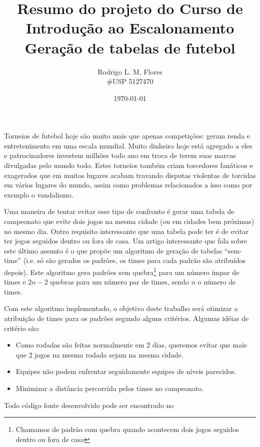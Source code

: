 \documentclass[a4paper,12pt,notitlepage]{article}
\title{Resumo do projeto do Curso de Introdução ao Escalonamento \\ Geração de tabelas de futebol}
\author{Rodrigo L. M. Flores \\ \#USP 5127470}
\date{\today}
\begin{document}
\maketitle

Torneios de futebol hoje são muito mais que apenas competições: geram renda e entretenimento em uma escala mundial. Muito dinheiro
hoje está agregado a eles e patrocinadores investem milhões todo ano em troca de terem suas marcas divulgadas pelo mundo todo. Estes
torneios também criam torcedores fanáticos e exagerados que em muitos lugares acabam travando disputas violentas de torcidas em vários 
lugares do mundo, assim como problemas relacionados a isso como por exemplo o vandalismo.

Uma maneira de tentar evitar esse tipo de confronto é gerar uma tabela de campeonato que evite
dois jogos na mesma cidade (ou em cidades bem próximas) no mesmo dia. Outro requisito interessante que uma tabela pode ter é de evitar
ter jogos seguidos dentro ou fora de casa. Um artigo interessante que fala sobre este último assunto é o %
que propõe um algoritmo de geração de tabelas ``sem-time'' (i.e. só são gerados os padrões, os times para cada padrão 
são atribuídos depois). Este algoritmo gera padrões sem quebra\footnote{Chamamos de padrão com quebra quando acontecem dois jogos seguidos
dentro ou fora de casa} para um número ímpar de times e $2n - 2$ quebras para um número par de times, sendo $n$ o número de times.

Com este algoritmo implementado, o objetivo deste trabalho será otimizar a atribuição de times para os padrões segundo alguns critérios. 
Algumas idéias de critério são:

\begin{itemize}
	\item Como rodadas são feitas normalmente em 2 dias, queremos evitar que mais que 2 jogos na mesma rodada sejam na mesma cidade. 
	\item Equipes não podem enfrentar seguidamente equipes de níveis parecidos. 
	\item Minimizar a distância percorrida pelos times no campeonato.
\end{itemize}

Todo código fonte desenvolvido pode ser encontrado no 
\end{document}
